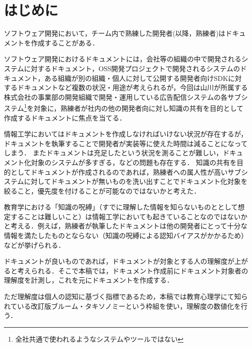\section{はじめに}
ソフトウェア開発において，チーム内で熟練した開発者(以降，熟練者)はドキュメントを作成することがある．\cite{bib:ozawa}

ソフトウェア開発におけるドキュメントには，会社等の組織の中で開発されるシステムに対するドキュメント，OSS開発プロジェクトで開発されるシステムのドキュメント，ある組織が別の組織・個人に対して公開する開発者向けSDKに対するドキュメントなど複数の状況・用途が考えられるが，今回は山川が所属する株式会社の事業部の開発組織で開発・運用している広告配信システムの各サブシステム\footnote{全社共通で使われるようなシステムやツールではない}を対象に，熟練者が社内の他の開発者向に対し知識の共有を目的として作成するドキュメントに焦点を当てる．

情報工学においてはドキュメントを作成しなければいけない状況が存在するが，ドキュメントを執筆することで開発者が実装等に使えた時間は減ることになってしまう．
またドキュメントは充足したという状況を測ることが難しい，ドキュメント化対象のシステムが多すぎる，などの問題も存在する．
知識の共有を目的としてドキュメントが作成されるのであれば，熟練者への属人性が高いサブシステムに対してドキュメントが無いものを洗い出すことでドキュメント化対象を絞ること，優先度を付けることが可能なのではないかと考えた．

教育学における「知識の呪縛」（すでに理解した情報を知らないものととして想定することは難しいこと）\cite{bib:kaneda}は情報工学においても起きていることなのではないかと考える．例えば，熟練者が執筆したドキュメントは他の開発者にとって十分な情報を満たしたものとならない（知識の呪縛による認知バイアスがかかるため）などが挙げられる．

ドキュメントが良いものであれば，ドキュメントが対象とする人の理解度が上がると考えられる．そこで本稿では，ドキュメント作成前にドキュメント対象者の理解度を計測し，これを元にドキュメントを作成する．

ただ理解度は個人の認知に基づく指標であるため，本稿では教育心理学にて知られている改訂版ブルーム・タキソノミー\cite{bib:nakao}という枠組を使い，理解度の数値化を行う．

